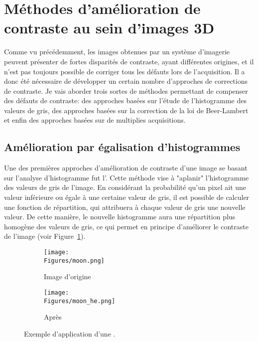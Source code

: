 \documentclass[\main/main.tex]{subfiles}
\begin{document}
            
\section{Méthodes d'amélioration de contraste au sein d'images 3D}

%
Comme vu précédemment, les images obtenues par un système d'imagerie peuvent présenter de fortes disparités de contraste, ayant différentes origines, et il n'est pas toujours possible de corriger tous les défauts lors de l'acquisition.
%
Il a donc été nécessaire de développer un certain nombre d'approches de corrections de contraste.
%
Je vais aborder trois sortes de méthodes permettant de compenser des défauts de contraste: des approches basées sur l'étude de l'histogramme des valeurs de gris, des approches basées sur la correction de la loi de Beer-Lambert et enfin des approches basées sur de multiplies acquisitions.

\subsection{Amélioration par égalisation d'histogrammes}

%
Une des premières approches d'amélioration de contraste d'une image se basant sur l'analyse d'histogramme fut l'\he{}.
%
Cette méthode vise à "aplanir" l'histogramme des valeurs de gris de l'image.
%
En considérant la probabilité qu'un pixel ait une valeur inférieure ou égale à une certaine valeur de gris,
il est possible de calculer une fonction de répartition, qui attribuera à chaque valeur de gris une nouvelle valeur. De cette manière, le nouvelle histogramme aura une répartition plus homogène des valeurs de gris, ce qui permet en principe d'améliorer le contraste de l'image (voir Figure~\ref{fig:he}).

\begin{figure}[h]
    \centering
    \begin{subfigure}[b]{0.45\textwidth}
       \caption{
       Image d'origine
            }
       \centering \texttt{[image: \\Figures/moon.png]}
    \end{subfigure}
    \begin{subfigure}[b]{0.45\textwidth}
       \caption{
       Après \he{}
            }
       \centering \texttt{[image: \\Figures/moon\_he.png]}
    \end{subfigure}
    \caption{
        \label{fig:he}
        Exemple d'application d'une \he{}.
    }
\end{figure}
\end{document}
